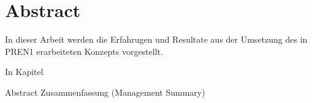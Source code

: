 \section*{Abstract}

In dieser Arbeit werden die Erfahrugen und Resultate aus der Umsetzung des in PREN1 erarbeiteten Konzepts vorgestellt. 

In Kapitel

Abstract
Zusammenfassung (Management Summary)